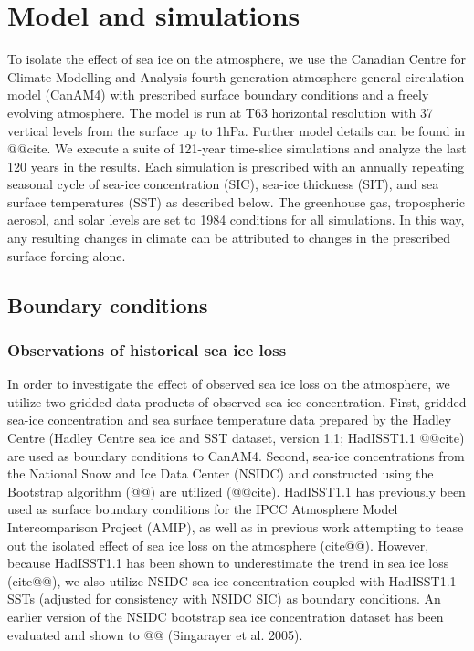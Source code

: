 \documentclass[twocol]{ametsoc}
\begin{document}
\section{Model and simulations}

To isolate the effect of sea ice on the atmosphere, we use the Canadian Centre for Climate Modelling and Analysis fourth-generation atmosphere general circulation model (CanAM4) with prescribed surface boundary conditions and a freely evolving atmosphere. The model is run at T63 horizontal resolution with 37 vertical levels from the surface up to 1hPa. Further model details can be found in @@cite. We execute a suite of 121-year time-slice simulations and analyze the last 120 years in the results. Each simulation is prescribed with an annually repeating seasonal cycle of sea-ice concentration (SIC), sea-ice thickness (SIT), and sea surface temperatures (SST) as described below. The greenhouse gas, tropospheric aerosol, and solar levels are set to 1984 conditions for all simulations. In this way, any resulting changes in climate can be attributed to changes in the prescribed surface forcing alone.

\subsection{Boundary conditions}
\subsubsection{Observations of historical sea ice loss}

In order to investigate the effect of observed sea ice loss on the atmosphere, we utilize two gridded data products of observed sea ice concentration. First, gridded sea-ice concentration and sea surface temperature data prepared by the Hadley Centre (Hadley Centre sea ice and SST dataset, version 1.1; HadISST1.1 @@cite) are used as boundary conditions to CanAM4. Second, sea-ice concentrations from the National Snow and Ice Data Center (NSIDC) and constructed using the Bootstrap algorithm (@@) are utilized (@@cite). HadISST1.1 has previously been used as surface boundary conditions for the IPCC Atmosphere Model Intercomparison Project (AMIP), as well as in previous work attempting to tease out the isolated effect of sea ice loss on the atmosphere (cite@@). However, because HadISST1.1 has been shown to underestimate the trend in sea ice loss (cite@@), we also utilize NSIDC sea ice concentration coupled with HadISST1.1 SSTs (adjusted for consistency with NSIDC SIC) as boundary conditions. An earlier version of the NSIDC bootstrap sea ice concentration dataset has been evaluated and shown to @@ (Singarayer et al. 2005). 
\end{document}
